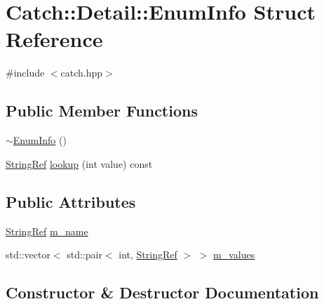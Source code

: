 \hypertarget{struct_catch_1_1_detail_1_1_enum_info}{}\section{Catch\+:\+:Detail\+:\+:Enum\+Info Struct Reference}
\label{struct_catch_1_1_detail_1_1_enum_info}


{\ttfamily \#include $<$catch.\+hpp$>$}

\subsection*{Public Member Functions}
\begin{DoxyCompactItemize}
\item 
\mbox{\hyperlink{struct_catch_1_1_detail_1_1_enum_info_ab6608593c00614a688045fe8d911258d}{$\sim$\+Enum\+Info}} ()
\item 
\mbox{\hyperlink{class_catch_1_1_string_ref}{String\+Ref}} \mbox{\hyperlink{struct_catch_1_1_detail_1_1_enum_info_a2fdfacc411d7afb1cb690366e5e49cb3}{lookup}} (int value) const
\end{DoxyCompactItemize}
\subsection*{Public Attributes}
\begin{DoxyCompactItemize}
\item 
\mbox{\hyperlink{class_catch_1_1_string_ref}{String\+Ref}} \mbox{\hyperlink{struct_catch_1_1_detail_1_1_enum_info_a16ecfd3a7e11439433aabbdf6ecb676c}{m\+\_\+name}}
\item 
std\+::vector$<$ std\+::pair$<$ int, \mbox{\hyperlink{class_catch_1_1_string_ref}{String\+Ref}} $>$ $>$ \mbox{\hyperlink{struct_catch_1_1_detail_1_1_enum_info_ad65c0537a50d375859295a2c18ade489}{m\+\_\+values}}
\end{DoxyCompactItemize}


\subsection{Constructor \& Destructor Documentation}
\mbox{\label{struct_catch_1_1_detail_1_1_enum_info_ab6608593c00614a688045fe8d911258d}} 
